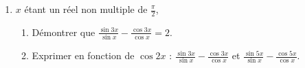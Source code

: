 \documentclass[12pt,a4paper]{article}
\begin{document}
\begin{multicols}{2}
\begin{enumerate}
    \item \( x \) étant un réel non multiple de \( \frac{\pi}{2} \),
    \begin{enumerate}
        \item Démontrer que \( \frac{\sin 3x}{\sin x} - \frac{\cos 3x}{\cos x} = 2 \).
        \item Exprimer en fonction de \( \cos 2x \) :
        \( \frac{\sin 3x}{\sin x} - \frac{\cos 3x}{\cos x} \) et 
        \( \frac{\sin 5x}{\sin x} - \frac{\cos 5x}{\cos x} \).
    \end{enumerate}
\end{enumerate}
\end{multicols}
\end{document}
